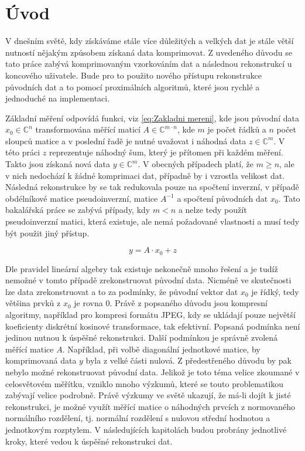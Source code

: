 \documentclass[FM,BP]{tulthesis}
\newcounter{Vzorce}
\begin{document}
\pagebreak

\renewcommand{\baselinestretch}{1.50}
\setlength\parindent{1.2cm}
\selectfont

\chapter{Úvod}
\label{ch:uvod}
 V dnešním světě, kdy získáváme stále více důležitých a velkých dat je stále větší nutností nějakým způsobem získaná data komprimovat. Z uvedeného důvodu se tato práce zabývá komprimovaným vzorkováním dat a následnou rekonstrukcí u koncového uživatele. Bude pro to použito nového přístupu rekonstrukce původních dat a to pomocí proximálních algoritmů, které jsou rychlé a jednoduché na implementaci.

Základní měření odpovídá funkci, viz \ref{eq:Zakladni mereni}, kde jsou původní data $x_0 \in \mathbb{C}^n$ transformována měřící maticí $A \in \mathbb{C} ^{m \cdot n}$, kde $m$ je počet řádků a $n$ počet sloupců matice a v poslední řadě je nutné uvažovat i náhodná data $z \in \mathbb{C}^m$. V této práci $z$ reprezentuje náhodný šum, který je přítomen při každém měření. Takto jsou získaná nová data $y \in \mathbb{C}^m$. V obecných případech platí, že $m \geq n$, ale v nich nedochází k žádné komprimaci dat, případně by i vzrostla velikost dat. Následná rekonstrukce by se tak redukovala pouze na spočtení inverzní, v případě obdélníkové matice pseudoinverzní, matice $A^{-1}$ a spočtení původních dat $x_0$. Tato bakalářská práce se zabývá případy, kdy $m < n$ a nelze tedy použít pseudoinverzní matici, která existuje, ale nemá požadované vlastnosti a musí tedy být použit jiný přístup.

\begin{equation} \label{eq:Zakladni mereni} \tag{Vzorec \theVzorce}
y = A \cdot x_0 + z
\end{equation}

Dle pravidel lineární algebry tak existuje nekonečně mnoho řešení a je tudíž nemožné v tomto případě zrekonstruovat původní data. Nicméně ve skutečnosti lze data zrekonstruovat a to za podmínky, že původní vektor dat $x_0$ je řídký, tedy většina prvků z $x_0$ je rovna $0$. Právě z popsaného důvodu jsou kompresní algoritmy, například pro kompresi formátu JPEG, kdy se ukládají pouze největší koeficienty diskrétní kosinové transformace, tak efektivní. Popsaná podmínka není jedinou nutnou k úspěšné rekonstrukci. Další podmínkou je správně zvolená měřící matice $A$. Například, při volbě diagonální jednotkové matice, by komprimovaná data $y$ byla z velké části nulová. Z předestřeného důvodu by pak nebylo možné rekonstruovat původní data. Jelikož je toto téma velice zkoumané v celosvětovém měřítku, vzniklo mnoho výzkumů, které se touto problematikou zabývají velice podrobně. Právě výzkumy ve světě ukazují, že má-li dojít k jisté rekonstrukci, je možné využít měřící matice o náhodných prvcích z normovaného normálního rozdělení, tj. normální rozdělení s nulovou střední hodnotou a jednotkovým rozptylem. V následujících kapitolách budou probrány jednotlivé kroky, které vedou k úspěšné rekonstrukci dat.
\end{document}
